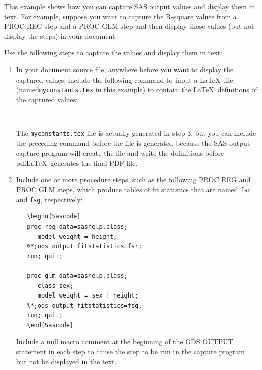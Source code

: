 \documentclass[article,oneside]{memoir}
\begin{document}
This example shows how you can capture SAS output values and display them in text.
For example, suppose you want to capture the R-square values from a PROC REG
step and a PROC GLM step and then display those values
(but not display the steps) in your document.

Use the following steps to capture the values and display them in text:

\begin{enumerate}
\item In your document source file, anywhere before you want to display the
      captured values, include the following command to
      input a \LaTeX\ file (named\newline\texttt{myconstants.tex} in this example)
      to contain the \LaTeX\ definitions of the captured values:
\begin{snugshade}
\begin{verbatim}
   
\end{verbatim}
\end{snugshade}

The \texttt{myconstants.tex} file is actually generated in step 3,
but you can include the preceding command before the file is generated
because the SAS output capture program will create the file and write
the definitions before pdf\LaTeX\ generates the final PDF file.

\item Include one or more procedure steps, such as the following
      PROC REG and PROC GLM steps, which produce tables of fit statistics
      that are named \texttt{fsr} and \texttt{fsg}, respectively:
\begin{snugshade}
\begin{verbatim}
   \begin{Sascode}
   proc reg data=sashelp.class;
      model weight = height;
   %*;ods output fitstatistics=fsr;
   run; quit;

   proc glm data=sashelp.class;
      class sex;
      model weight = sex | height;
   %*;ods output fitstatistics=fsg;
   run; quit;
   \end{Sascode}
\end{verbatim}
\end{snugshade}

Include a null macro comment at the beginning of the ODS OUTPUT statement
in each step to cause the step to be run in the capture program but not be
displayed in the text.


\end{enumerate}
\end{document}
